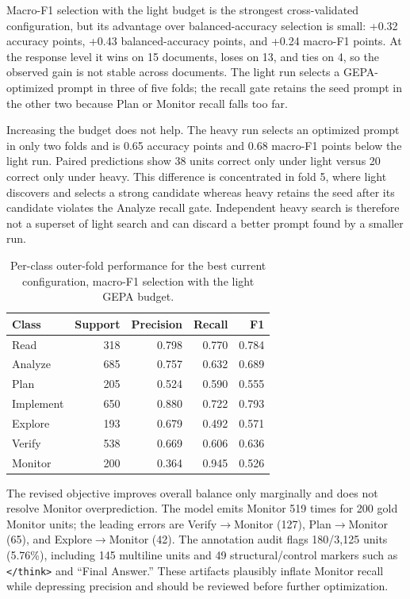Macro-F1 selection with the light budget is the strongest cross-validated
configuration, but its advantage over balanced-accuracy selection is small:
+0.32 accuracy points, +0.43 balanced-accuracy points, and +0.24 macro-F1
points.  At the response level it wins on 15 documents, loses on 13, and ties
on 4, so the observed gain is not stable across documents.  The light run
selects a GEPA-optimized prompt in three of five folds; the recall gate retains
the seed prompt in the other two because Plan or Monitor recall falls too far.

Increasing the budget does not help.  The heavy run selects an optimized
prompt in only two folds and is 0.65 accuracy points and 0.68 macro-F1 points
below the light run.  Paired predictions show 38 units correct only under
light versus 20 correct only under heavy.  This difference is concentrated in
fold 5, where light discovers and selects a strong candidate whereas heavy
retains the seed after its candidate violates the Analyze recall gate.
Independent heavy search is therefore not a superset of light search and can
discard a better prompt found by a smaller run.

\begin{table}[t]
\centering
\caption{Per-class outer-fold performance for the best current configuration,
macro-F1 selection with the light GEPA budget.  }
\label{tab:exp0a-classes}
\begin{tabular}{lrrrr}
\toprule
Class & Support & Precision & Recall & F1 \\
\midrule
Read      & 318 & 0.798 & 0.770 & 0.784 \\
Analyze   & 685 & 0.757 & 0.632 & 0.689 \\
Plan      & 205 & 0.524 & 0.590 & 0.555 \\
Implement & 650 & 0.880 & 0.722 & 0.793 \\
Explore   & 193 & 0.679 & 0.492 & 0.571 \\
Verify    & 538 & 0.669 & 0.606 & 0.636 \\
Monitor   & 200 & 0.364 & 0.945 & 0.526 \\
\bottomrule
\end{tabular}
\end{table}

The revised objective improves overall balance only marginally and does not
resolve Monitor overprediction.  The model emits Monitor 519 times for 200
gold Monitor units; the leading errors are Verify$\rightarrow$Monitor (127),
Plan$\rightarrow$Monitor (65), and Explore$\rightarrow$Monitor (42).  The
annotation audit flags 180/3,125 units (5.76\%), including 145 multiline units
and 49 structural/control markers such as \texttt{</think>} and ``Final
Answer.''  These artifacts plausibly inflate Monitor recall while depressing
precision and should be reviewed before further optimization.

